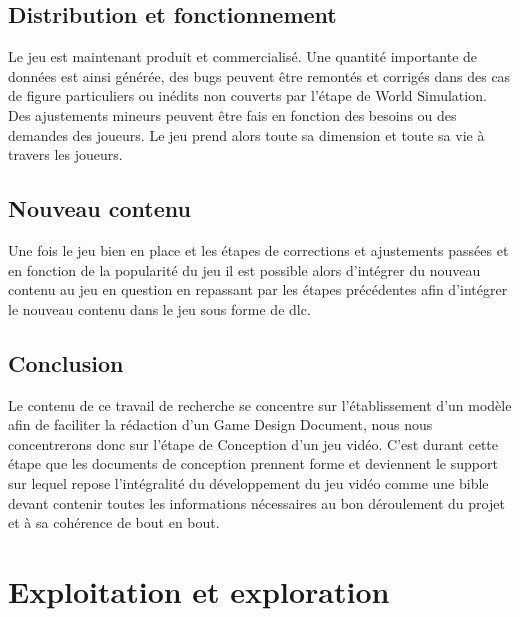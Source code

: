 \subsection{Distribution et fonctionnement}
Le jeu est maintenant produit et commercialisé. Une quantité importante de données est ainsi générée, des bugs peuvent être remontés et corrigés dans des cas de figure particuliers ou inédits non couverts par l'étape de World Simulation. Des ajustements mineurs peuvent être fais en fonction des besoins ou des demandes des joueurs. Le jeu prend alors toute sa dimension et toute sa vie à travers les joueurs.

\subsection{Nouveau contenu}
Une fois le jeu bien en place et les étapes de corrections et ajustements passées et en fonction de la popularité du jeu il est possible alors d'intégrer du nouveau contenu au jeu en question en repassant par les étapes précédentes afin d'intégrer le nouveau contenu dans le jeu sous forme de \gls{dlc}.

\subsection{Conclusion}
Le contenu de ce travail de recherche se concentre sur l'établissement d'un modèle afin de faciliter la rédaction d'un Game Design Document, nous nous concentrerons donc sur l'étape de Conception d'un jeu vidéo. C'est durant cette étape que les documents de conception prennent forme et deviennent le support sur lequel repose l'intégralité du développement du jeu vidéo comme une bible devant contenir toutes les informations nécessaires au bon déroulement du projet et à sa cohérence de bout en bout.



\section{Exploitation et exploration}
